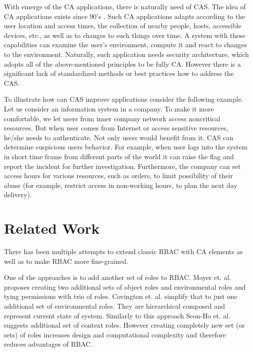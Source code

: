 \documentclass{sig-alternate}
\begin{document}
With emerge of the CA applications, there is naturally need of CAS. The idea of CA applications exists since 90's \cite{contextaware}. Such CA applications adapts according to the user location and access times, the collection of nearby people, hosts, accessible devices, etc., as well as to changes to such things over time. A system with these capabilities can examine the user's environment, compute it and react to changes to the environment. Naturally, such application needs security architecture, which adopts all of the above-mentioned principles to be fully CA. However there is a significant lack of standardized methods or best practices how to address the CAS.

To illustrate how can CAS improve applications consider the following example. Let us consider an information system in a company. To make it more comfortable, we let users from inner company network access noncritical resources. But when user comes from Internet or access sensitive resources, he/she needs to authenticate. Not only users would benefit from it. CAS can determine suspicious users behavior. For example, when user logs into the system in short time frame from different parts of the world it can raise the flag and report the incident for further investigation. Furthermore, the company can set access hours for various resources, such as orders, to limit possibility of their abuse (for example, restrict access in non-working hours, to plan the next day delivery).

\section{Related Work}
There has been multiple attempts to extend classic RBAC with CA elements as well as to make RBAC more fine-grained.

One of the approaches is to add another set of roles to RBAC. Moyer et. al. \cite{grbac} proposes creating two additional sets of object roles and environmental roles and tying permissions with trio of roles. Covington et. al. \cite{envroles} simplify that to just one additional set of environmental roles. They are hierarchical composed and represent current state of system. Similarly to this approach Seon-Ho et. al. \cite{contextroles} suggests additional set of context roles. However creating completely new set (or sets) of roles increases design and computational complexity and therefore reduces advantages of RBAC.
\end{document}
